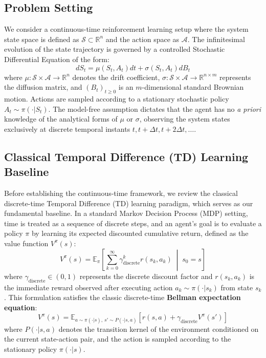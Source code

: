 \documentclass{article}
\begin{document}
\subsection{Problem Setting}
We consider a continuous-time reinforcement learning setup where the system state space is defined as $\mathcal{S} \subset \mathbb{R}^n$ and the action space as $\mathcal{A}$. The infinitesimal evolution of the state trajectory is governed by a controlled Stochastic Differential Equation of the form:
\begin{equation}
    dS_t = \mu(S_t, A_t) dt + \sigma(S_t, A_t) dB_t
\end{equation}
where $\mu: \mathcal{S} \times \mathcal{A} \to \mathbb{R}^n$ denotes the drift coefficient, $\sigma: \mathcal{S} \times \mathcal{A} \to \mathbb{R}^{n \times m}$ represents the diffusion matrix, and $(B_t)_{t \ge 0}$ is an $m$-dimensional standard Brownian motion. Actions are sampled according to a stationary stochastic policy $A_t \sim \pi(\cdot | S_t)$. The model-free assumption dictates that the agent has no \textit{a priori} knowledge of the analytical forms of $\mu$ or $\sigma$, observing the system states exclusively at discrete temporal instants $t, t+\Delta t, t+2\Delta t, \dots$.

\subsection{Classical Temporal Difference (TD) Learning Baseline}
Before establishing the continuous-time framework, we review the classical discrete-time Temporal Difference (TD) learning paradigm, which serves as our fundamental baseline. In a standard Markov Decision Process (MDP) setting, time is treated as a sequence of discrete steps, and an agent's goal is to evaluate a policy $\pi$ by learning its expected discounted cumulative return, defined as the value function $V^\pi(s)$:
\begin{equation}
    V^{\pi}(s) = \mathbb{E}_{\pi} \left[ \sum_{k=0}^{\infty} \gamma_{\text{discrete}}^{k} r(s_k, a_k) \;\middle|\; s_0 = s \right]
\end{equation}
where $\gamma_{\text{discrete}} \in (0, 1)$ represents the discrete discount factor and $r(s_k, a_k)$ is the immediate reward observed after executing action $a_k \sim \pi(\cdot|s_k)$ from state $s_k$. This formulation satisfies the classic discrete-time \textbf{Bellman expectation equation}:
\begin{equation}
    V^{\pi}(s) = \mathbb{E}_{a \sim \pi(\cdot|s), \, s' \sim P(\cdot|s,a)} \left[ r(s, a) + \gamma_{\text{discrete}} V^{\pi}(s') \right]
\end{equation}
where $P(\cdot|s,a)$ denotes the transition kernel of the environment conditioned on the current state-action pair, and the action is sampled according to the stationary policy $\pi(\cdot|s)$.
\end{document}
